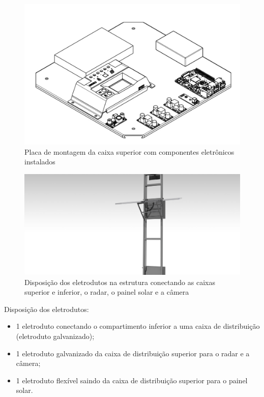 \begin{figure}[H]
	\centering
    \includegraphics[keepaspectratio=true,scale=0.3]{figuras/placademontagemcomcomp.jpeg}
    \caption{Placa de montagem da caixa superior com componentes eletrônicos instalados}
    \label{circ}
\end{figure}

\begin{figure}[H]
	\centering
    \includegraphics[keepaspectratio=true,scale=0.5]{figuras/eletrodutos.png}
    \caption{Disposição dos eletrodutos na estrutura conectando as caixas superior e inferior, o radar, o painel solar e a câmera}
    \label{eletrod}
\end{figure}

Disposição dos eletrodutos:

\begin{itemize}
\item 1 eletroduto conectando o compartimento inferior a uma caixa de distribuição (eletroduto galvanizado);
\item 1 eletroduto galvanizado da caixa de distribuição superior para o radar e a câmera;
\item 1 eletroduto flexível saindo da caixa de distribuição superior para o painel solar.
\end{itemize}

